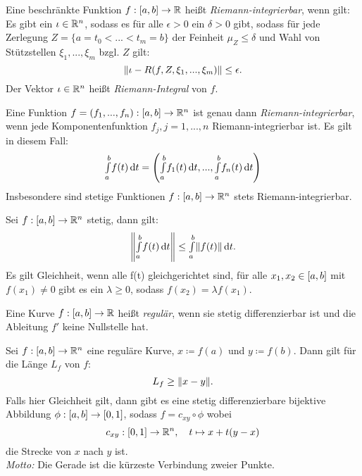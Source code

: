 \documentclass{cheat-sheet}
\begin{document}

\begin{defn}
  Eine beschränkte Funktion $f : \left[ a, b \right] \to \mathbb{R}$ heißt \emph{Riemann-integrierbar}, wenn gilt: Es gibt ein $\iota \in \mathbb{R}^n$, sodass es für alle $\epsilon > 0$ ein $\delta > 0$ gibt, sodass für jede Zerlegung $Z = \{ a = t_0 < ... < t_m = b \}$ der Feinheit $\mu_Z \le \delta$ und Wahl von Stützstellen $\xi_1, ..., \xi_m$ bzgl. $Z$ gilt:
  \[ \lVert\iota - R(f, Z, \xi_1, ..., \xi_m)\rVert \le \epsilon. \]
  Der Vektor $\iota \in \mathbb{R}^n$ heißt \emph{Riemann-Integral} von $f$.
\end{defn}

\begin{bem}
  Eine Funktion $f = (f_1, ..., f_n) : \left[ a, b \right] \to \mathbb{R}^n$ ist genau dann \emph{Riemann-integrierbar}, wenn jede Komponentenfunktion $f_j, j = 1, ..., n$ Riemann-integrierbar ist. Es gilt in diesem Fall:
  \[ {\textstyle \int\limits_{a}^{b}} f(t) \,\mathrm{d} t = \left( {\textstyle \int\limits_{a}^{b}} f_1(t) \,\mathrm{d} t, ..., {\textstyle \int\limits_{a}^{b}} f_n(t) \,\mathrm{d} t \right) \]
  Insbesondere sind stetige Funktionen $f : \left[ a, b \right] \to \mathbb{R}^n$ stets Riemann-integrierbar.
\end{bem}

\begin{satz}
  Sei $f : \left[ a, b \right] \to \mathbb{R}^n$ stetig, dann gilt:
  \[ \left\| {\textstyle \int\limits_{a}^{b}} f(t) \,\mathrm{d} t \right\| \le {\textstyle \int\limits_{a}^{b}} \lVert f(t)\rVert \,\mathrm{d} t. \]
  Es gilt Gleichheit, wenn alle f(t) gleichgerichtet sind, \dh{} für alle $x_1, x_2 \in \left[ a, b \right]$ mit $f(x_1) \not= 0$ gibt es ein $\lambda \ge 0$, sodass $f(x_2) = \lambda f(x_1)$.
\end{satz}

\begin{defn}
  Eine Kurve $f : \left[ a, b \right] \to \mathbb{R}$ heißt \emph{regulär}, wenn sie stetig differenzierbar ist und die Ableitung $f'$ keine Nullstelle hat.
\end{defn}

\begin{kor}
  Sei $f : \left[ a, b \right] \to \mathbb{R}^n$ eine reguläre Kurve, $x \coloneqq f(a)$ und $y \coloneqq f(b)$. Dann gilt für die Länge $L_f$ von $f$:
  \[ L_f \ge \lVert x - y\rVert. \]
  Falls hier Gleichheit gilt, dann gibt es eine stetig differenzierbare bijektive Abbildung $\phi : \left[ a, b \right] \to \left[ 0, 1 \right]$, sodass $f = c_{xy} \circ \phi$ wobei
  \[ c_{xy} : \left[ 0, 1 \right] \to \mathbb{R}^n,\quad t \mapsto x + t(y - x) \]
  die Strecke von $x$ nach $y$ ist.\\
  \textit{Motto:} Die Gerade ist die kürzeste Verbindung zweier Punkte.
\end{kor}
\end{document}
